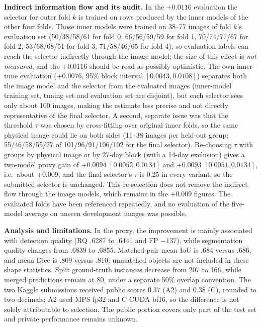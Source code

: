 \documentclass[sigconf]{acmart}
\begin{document}
\textbf{Indirect information flow and its audit.} In the $+0.0116$ evaluation the selector for outer fold $k$ is trained on rows produced by the inner models of the other four folds. Those inner models were trained on 38--77 images of fold $k$'s evaluation set (50/38/58/61 for fold 0, 66/56/59/59 for fold 1, 70/74/77/67 for fold 2, 53/68/68/51 for fold 3, 71/58/46/65 for fold 4), so evaluation labels can reach the selector indirectly through the image model; the size of this effect is \emph{not measured}, and the $+0.0116$ should be read as possibly optimistic. The own-inner-tune evaluation ($+0.0076$, 95\% block interval $[0.0043,0.0108]$) separates both the image model and the selector from the evaluated images (inner-model training set, tuning set and evaluation set are disjoint), but each selector sees only about 100 images, making the estimate less precise and not directly representative of the final selector. A second, separate issue was that the threshold $\tau$ was chosen by cross-fitting over original inner folds, so the same physical image could lie on both sides (11--38 images per held-out group; 55/46/58/55/27 of 101/96/91/106/102 for the final selector). Re-choosing $\tau$ with groups by physical image or by 27-day block (with a 14-day exclusion) gives a two-model proxy gain of $+0.0094$ $[0.0052,0.0134]$ and $+0.0093$ $[0.0051,0.0134]$, i.e.\ about $+0.009$, and the final selector's $\tau$ is 0.25 in every variant, so the submitted selector is unchanged. This re-selection does not remove the indirect flow through the image models, which remains in the $+0.009$ figures. The evaluated folds have been referenced repeatedly, and no evaluation of the five-model average on unseen development images was possible.

\textbf{Analysis and limitations.} In the proxy, the improvement is mainly associated with detection quality (RQ .6287 to .6441 and FP $-137$), while segmentation quality changes from .6839 to .6855. Matched-pair mean IoU is .684 versus .686, and mean Dice is .809 versus .810; unmatched objects are not included in these shape statistics. Split ground-truth instances decrease from 207 to 166, while merged predictions remain at 80, under a separate 50\% overlap convention. The two Kaggle submissions received public scores 0.37 (A2) and 0.38 (C), rounded to two decimals; A2 used MPS fp32 and C CUDA bf16, so the difference is not solely attributable to selection. The public portion covers only part of the test set and private performance remains unknown.
\end{document}
